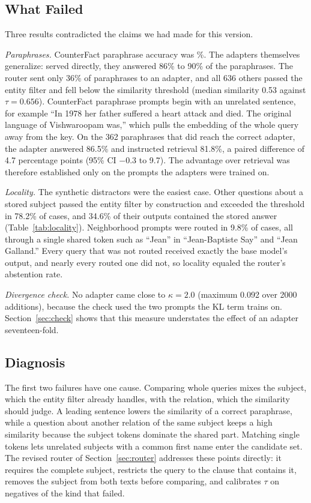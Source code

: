 \documentclass[journal,10pt]{IEEEtran}
\begin{document}


\subsection{What Failed}
Three results contradicted the claims we had made for this version.

\emph{Paraphrases.} CounterFact paraphrase accuracy was \cfParaPct\%. The adapters
themselves generalize: served directly, they answered 86\% to 90\% of the paraphrases.
The router sent only 36\% of paraphrases to an adapter, and all 636 others passed the
entity filter and fell below the similarity threshold (median similarity 0.53 against
$\tau=0.656$). CounterFact paraphrase prompts begin with an unrelated sentence, for
example ``In 1978 her father suffered a heart attack and died. The original language of
Vishwaroopam was,'' which pulls the embedding of the whole query away from the key. On
the 362 paraphrases that did reach the correct adapter, the adapter answered 86.5\% and
instructed retrieval 81.8\%, a paired difference of 4.7 percentage points (95\% CI $-0.3$
to 9.7). The advantage over retrieval was therefore established only on the prompts the
adapters were trained on.

\emph{Locality.} The synthetic distractors were the easiest case. Other questions about
a stored subject passed the entity filter by construction and exceeded the threshold in
78.2\% of cases, and 34.6\% of their outputs contained the stored answer
(Table~\ref{tab:locality}). Neighborhood prompts were routed in 9.8\% of cases, all
through a single shared token such as ``Jean'' in ``Jean-Baptiste Say'' and ``Jean
Galland.'' Every query that was not routed received exactly the base model's output, and
nearly every routed one did not, so locality equaled the router's abstention rate.

\emph{Divergence check.} No adapter came close to $\kappa=2.0$ (maximum 0.092 over 2000
additions), because the check used the two prompts the KL term trains on. Section~\ref{sec:check}
shows that this measure understates the effect of an adapter seventeen-fold.

\subsection{Diagnosis}
The first two failures have one cause. Comparing whole queries mixes the subject, which
the entity filter already handles, with the relation, which the similarity should judge.
A leading sentence lowers the similarity of a correct paraphrase, while a question about
another relation of the same subject keeps a high similarity because the subject tokens
dominate the shared part. Matching single tokens lets unrelated subjects with a common
first name enter the candidate set. The revised router of Section~\ref{sec:router}
addresses these points directly: it requires the complete subject, restricts the query
to the clause that contains it, removes the subject from both texts before comparing,
and calibrates $\tau$ on negatives of the kind that failed.
\end{document}
